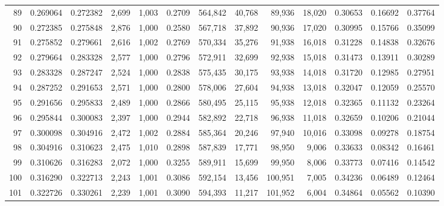 \begin{tabular}{rrrrrrrrrrrrr}
89  &  0.269064 &  0.272382 &   2,699 &  1,003 &                                     0.2709 &  564,842 &   40,768 &   89,936 &   18,020 &  0.30653 &  0.16692 &  0.37764 \\
90  &  0.272385 &  0.275848 &   2,876 &  1,000 &                                     0.2580 &  567,718 &   37,892 &   90,936 &   17,020 &  0.30995 &  0.15766 &  0.35099 \\
91  &  0.275852 &  0.279661 &   2,616 &  1,002 &                                     0.2769 &  570,334 &   35,276 &   91,938 &   16,018 &  0.31228 &  0.14838 &  0.32676 \\
92  &  0.279664 &  0.283328 &   2,577 &  1,000 &                                     0.2796 &  572,911 &   32,699 &   92,938 &   15,018 &  0.31473 &  0.13911 &  0.30289 \\
93  &  0.283328 &  0.287247 &   2,524 &  1,000 &                                     0.2838 &  575,435 &   30,175 &   93,938 &   14,018 &  0.31720 &  0.12985 &  0.27951 \\
94  &  0.287252 &  0.291653 &   2,571 &  1,000 &                                     0.2800 &  578,006 &   27,604 &   94,938 &   13,018 &  0.32047 &  0.12059 &  0.25570 \\
95  &  0.291656 &  0.295833 &   2,489 &  1,000 &                                     0.2866 &  580,495 &   25,115 &   95,938 &   12,018 &  0.32365 &  0.11132 &  0.23264 \\
96  &  0.295844 &  0.300083 &   2,397 &  1,000 &                                     0.2944 &  582,892 &   22,718 &   96,938 &   11,018 &  0.32659 &  0.10206 &  0.21044 \\
97  &  0.300098 &  0.304916 &   2,472 &  1,002 &                                     0.2884 &  585,364 &   20,246 &   97,940 &   10,016 &  0.33098 &  0.09278 &  0.18754 \\
98  &  0.304916 &  0.310623 &   2,475 &  1,010 &                                     0.2898 &  587,839 &   17,771 &   98,950 &    9,006 &  0.33633 &  0.08342 &  0.16461 \\
99  &  0.310626 &  0.316283 &   2,072 &  1,000 &                                     0.3255 &  589,911 &   15,699 &   99,950 &    8,006 &  0.33773 &  0.07416 &  0.14542 \\
100 &  0.316290 &  0.322713 &   2,243 &  1,001 &                                     0.3086 &  592,154 &   13,456 &  100,951 &    7,005 &  0.34236 &  0.06489 &  0.12464 \\
101 &  0.322726 &  0.330261 &   2,239 &  1,001 &                                     0.3090 &  594,393 &   11,217 &  101,952 &    6,004 &  0.34864 &  0.05562 &  0.10390 \\

\end{tabular}
